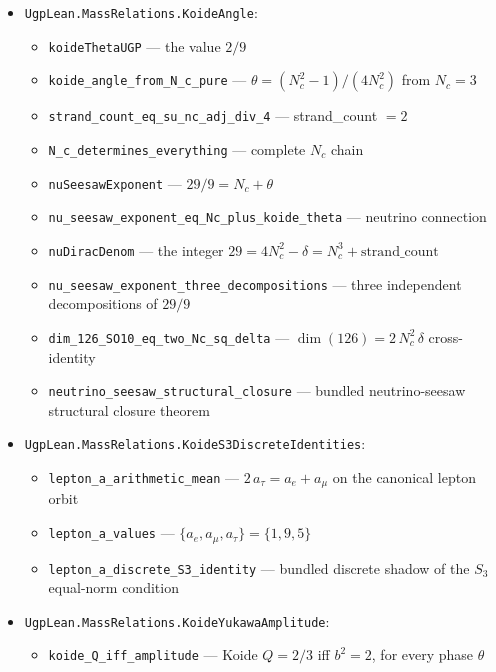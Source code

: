 \documentclass[11pt]{article}
\theoremstyle{remark}
\begin{document}
\begin{itemize}[leftmargin=1.3em,itemsep=0.1em]
  \item \nolinkurl{UgpLean.MassRelations.KoideAngle}:
    \begin{itemize}[leftmargin=1.3em,itemsep=0.05em]
      \item \nolinkurl{koideThetaUGP} --- the value $2/9$
      \item \nolinkurl{koide_angle_from_N_c_pure} --- $\theta = (N_c^2-1)/(4N_c^2)$ from $N_c = 3$
      \item \nolinkurl{strand_count_eq_su_nc_adj_div_4} --- strand\_count $= 2$
      \item \nolinkurl{N_c_determines_everything} --- complete $N_c$ chain
      \item \nolinkurl{nuSeesawExponent} --- $29/9 = N_c + \theta$
      \item \nolinkurl{nu_seesaw_exponent_eq_Nc_plus_koide_theta} --- neutrino connection
      \item \nolinkurl{nuDiracDenom} --- the integer $29 = 4N_c^2 - \delta = N_c^3 + \text{strand\_count}$
      \item \nolinkurl{nu_seesaw_exponent_three_decompositions} --- three independent decompositions of $29/9$
      \item \nolinkurl{dim_126_SO10_eq_two_Nc_sq_delta} --- $\dim(126) = 2\,N_c^2\,\delta$ cross-identity
      \item \nolinkurl{neutrino_seesaw_structural_closure} --- bundled neutrino-seesaw structural closure theorem
    \end{itemize}
  \item \nolinkurl{UgpLean.MassRelations.KoideS3DiscreteIdentities}:
    \begin{itemize}[leftmargin=1.3em,itemsep=0.05em]
      \item \nolinkurl{lepton_a_arithmetic_mean} --- $2\, a_\tau = a_e + a_\mu$ on the canonical lepton orbit
      \item \nolinkurl{lepton_a_values} --- $\{a_e, a_\mu, a_\tau\} = \{1, 9, 5\}$
      \item \nolinkurl{lepton_a_discrete_S3_identity} --- bundled discrete shadow of the $S_3$ equal-norm condition
    \end{itemize}
  \item \nolinkurl{UgpLean.MassRelations.KoideYukawaAmplitude}:
    \begin{itemize}[leftmargin=1.3em,itemsep=0.05em]
      \item \nolinkurl{koide_Q_iff_amplitude} --- Koide $Q=2/3$ iff $b^2=2$, for every phase $\theta$

\end{itemize}
\end{itemize}
\end{document}
